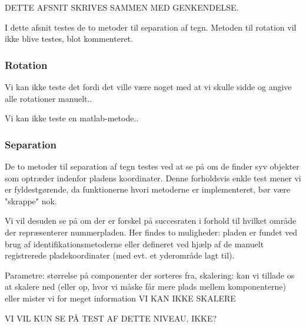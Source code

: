 DETTE AFSNIT SKRIVES SAMMEN MED GENKENDELSE.

I dette afsnit testes de to metoder til separation af tegn. Metoden til rotation vil ikke blive testes, blot kommenteret.

\subsubsection*{Rotation}

Vi kan ikke teste det fordi det ville være noget med at vi skulle sidde og angive alle rotationer manuelt..

Vi kan ikke teste en matlab-metode..

\subsubsection*{Separation}
De to metoder til separation af tegn testes ved at se på om de finder syv objekter som optræder indenfor pladens koordinater. Denne forholdsvis enkle test mener vi er fyldestgørende, da funktionerne hvori metoderne er implementeret, bør være "skrappe" nok.

Vi vil desuden se på om der er forskel på succesraten i forhold til hvilket område der repræsenterer nummerpladen. Her findes to muligheder: pladen er fundet ved brug af identifikationsmetoderne eller defineret ved hjælp af de manuelt registrerede pladekoordinater (med evt. et yderområde lagt til).

Parametre: størrelse på componenter der sorteres fra, skalering: kan vi tillade os at skalere ned (eller op, hvor vi måske får mere plads mellem komponenterne) eller mister vi for meget information VI KAN IKKE SKALERE

VI VIL KUN SE PÅ TEST AF DETTE NIVEAU, IKKE? 




